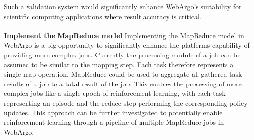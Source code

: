 Such a validation system would significantly enhance WebArgo's suitability for scientific computing applications where result accuracy is critical.
\\~\\
\textbf{Implement the MapReduce model}
Implementing the MapReduce \cite{conclusion:map-reduce} model in WebArgo is a big opportunity to significantly enhance the platforms capability of providing more complex jobs. Currently the processing module of a job can be assumed to be similar to the mapping step. Each task therefore represents a single map operation. MapReduce could be used to aggregate all gathered task results of a job to a total result of the job. This enables the processing of more complex jobs like a single epoch of reinforcement learning, with each task representing an episode and the reduce step performing the corresponding policy updates. This approach can be further investigated to potentially enable reinforcement learning through a pipeline of multiple MapReduce jobs in WebArgo.